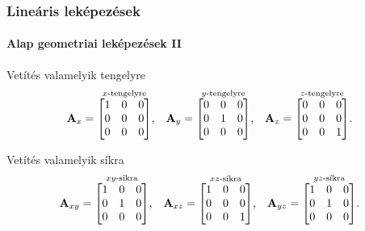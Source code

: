 \begin{frame}
  \frametitle{Lineáris leképezések}
  \framesubtitle{Alap geometriai leképezések II}

  \begin{block}{Vetítés valamelyik tengelyre}
    \[
      \mathbf{A}_x = \overset{x\text{-tengelyre}}{\begin{bmatrix}
          1 & 0 & 0 \\
          0 & 0 & 0 \\
          0 & 0 & 0
        \end{bmatrix}}
      \text,
      \quad
      \mathbf{A}_y = \overset{y\text{-tengelyre}}{\begin{bmatrix}
          0 & 0 & 0 \\
          0 & 1 & 0 \\
          0 & 0 & 0
        \end{bmatrix}}
      \text,
      \quad
      \mathbf{A}_z = \overset{z\text{-tengelyre}}{\begin{bmatrix}
          0 & 0 & 0 \\
          0 & 0 & 0 \\
          0 & 0 & 1
        \end{bmatrix}}
      \text.
    \]
  \end{block}

  \begin{block}{Vetítés valamelyik síkra}
    \[
      \mathbf{A}_{xy} = \overset{xy\text{-síkra}}{\begin{bmatrix}
          1 & 0 & 0 \\
          0 & 1 & 0 \\
          0 & 0 & 0
        \end{bmatrix}}
      \text,
      \quad
      \mathbf{A}_{xz} = \overset{xz\text{-síkra}}{\begin{bmatrix}
          1 & 0 & 0 \\
          0 & 0 & 0 \\
          0 & 0 & 1
        \end{bmatrix}}
      \text,
      \quad
      \mathbf{A}_{yz} = \overset{yz\text{-síkra}}{\begin{bmatrix}
          1 & 0 & 0 \\
          0 & 1 & 0 \\
          0 & 0 & 0
        \end{bmatrix}}
      \text.
    \]
  \end{block}
\end{frame}

